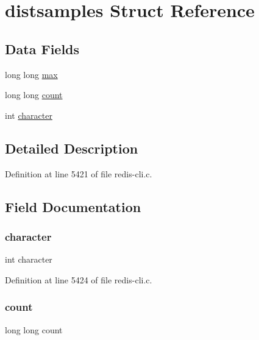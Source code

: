 \hypertarget{structdistsamples}{}\section{distsamples Struct Reference}
\label{structdistsamples}
\subsection*{Data Fields}
\begin{DoxyCompactItemize}
\item 
long long \hyperlink{structdistsamples_a3cc3af20c4a8a67e42db241f8e90472b}{max}
\item 
long long \hyperlink{structdistsamples_a3171cac2da70b2ce888d76a879f32c5b}{count}
\item 
int \hyperlink{structdistsamples_af36ff273acc44c769de8e2f44a081dca}{character}
\end{DoxyCompactItemize}


\subsection{Detailed Description}


Definition at line 5421 of file redis-\/cli.\+c.



\subsection{Field Documentation}
\mbox{\label{structdistsamples_af36ff273acc44c769de8e2f44a081dca}} 
\subsubsection{\texorpdfstring{character}{character}}
{\footnotesize\ttfamily int character}



Definition at line 5424 of file redis-\/cli.\+c.

\mbox{\label{structdistsamples_a3171cac2da70b2ce888d76a879f32c5b}} 
\subsubsection{\texorpdfstring{count}{count}}
{\footnotesize\ttfamily long long count}



